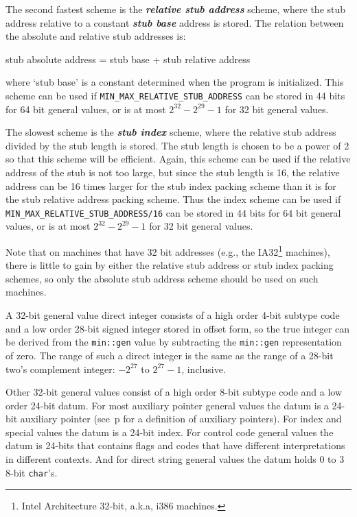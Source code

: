\documentclass[12pt]{article}
\newcommand{\key}[1]{{\bf \em #1}\index{#1}}
\newcommand{\pagref}[1]{p\pageref{#1}}
\newcommand{\EOL}{\penalty \exhyphenpenalty}
\begin{document}
The second fastest scheme is the \key{relative stub address}
\label{RELATIVE-STUB-ADDRESS} scheme, where the
stub address relative to a constant \key{stub base}
address is stored.
The relation between the absolute and relative stub addresses is:

\begin{center}
stub absolute address = stub base + stub relative address
\end{center}

where `stub base' is a constant determined when the program is
initialized.
This scheme can be used if
{\tt MIN\_\EOL MAX\_\EOL RELATIVE\_\EOL STUB\_\EOL ADDRESS}
can be stored in 44 bits for 64 bit general values, or is at most
$2^{32}-2^{29}-1$ for 32 bit general values.

The slowest scheme is the \key{stub index} scheme, where the
relative stub address divided by the stub length is stored.
The stub length is chosen to be a power of 2 so that this
scheme will be efficient.  Again, this scheme can be used
if the relative address of the stub is not too large, but since
the stub length is 16, the relative address can be 16 times larger
for the stub index packing scheme than it is for the stub relative address
packing scheme.
Thus the index scheme can be used if
{\tt MIN\_\EOL MAX\_\EOL RELATIVE\_\EOL STUB\_\EOL ADDRESS/16}
can be stored in 44 bits for 64 bit general values, or is at most
$2^{32}-2^{29}-1$ for 32 bit general values.

Note that on machines that have 32 bit addresses (e.g.,
the IA32\footnote{Intel Architecture 32-bit, a.k.a, i386 machines.}
machines), there is little to gain by either the relative stub address
or stub index packing schemes,
so only the absolute stub address scheme should be used on such machines.

A 32-bit general value direct integer consists of a high order 4-bit
subtype code and a low order 28-bit signed integer stored in offset form,
so the true integer can be derived from the {\tt min::gen} value by
subtracting the {\tt min::gen} representation of zero.
The range of such a direct integer is the same as the range of a 28-bit
two's complement integer: $-2^{27}$ to $2^{27}-1$, inclusive.

Other 32-bit general values consist of a high order
8-bit subtype code and a low order 24-bit datum.
For most auxiliary pointer
general values the datum is a 24-bit auxiliary pointer
(see~\pagref{OBJECT-BODY-AUXILIARY-POINTER}
for a definition of auxiliary pointers).
For index and special values the datum is a 24-bit index.
For control code general values the datum is 24-bits that
contains flags and codes that have different interpretations in different
contexts.  And for direct string general values the datum
holds 0 to 3 8-bit {\tt char}'s.
\end{document}
